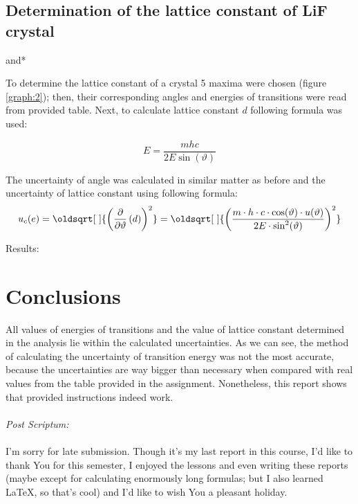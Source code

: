 \documentclass[12pt, a4paper]{extarticle}
\renewcommand*{\sqrt}[2][\ ]{\oldsqrt[#1]{#2} }
\begin{document}
	\subsection{Determination of the lattice constant of LiF crystal}
	and*\familydefault{\rmdefault}

	To determine the lattice constant of a crystal 5 maxima were chosen (figure \ref{graph:2}); then, their corresponding angles and energies of transitions were read from provided table. Next, to calculate lattice constant $ d $ following formula was used:

	\begin{equation}\label{key}
		E = \dfrac{mhc}{2 E \sin(\vartheta)}
	\end{equation}

	The uncertainty of angle was calculated in similar matter as before and the uncertainty of lattice constant using following formula:
	\begin{equation}\label{key}
		u_c(e) = \sqrt{\left( \dfrac{\partial}{\partial \vartheta} \left( d \right) \right)^2}= \sqrt{\left( \dfrac{m \cdot h \cdot c \cdot \cos(\vartheta) \cdot u(\vartheta)}{2 E \cdot \sin^2(\vartheta)}\right)^2}
	\end{equation}

	Results:

	\section{Conclusions}

	All values of energies of transitions and the value of lattice constant determined in the analysis lie within the calculated uncertainties. As we can see, the method of calculating the uncertainty of transition energy was not the most accurate, because the uncertainties are way bigger than necessary when compared with real values from the table provided in the assignment. Nonetheless, this report shows that provided instructions indeed work. \\
	\vspace{2cm}\\

	\textit{Post Scriptum:}\\
	\\
	I'm sorry for late submission. Though it's my last report in this course, I'd like to thank You for this semester, I enjoyed the lessons and even writing these reports (maybe except for calculating enormously long formulas; but I also learned \LaTeX,  so that's cool) and I'd like to wish You a pleasant holiday.
\end{document}
